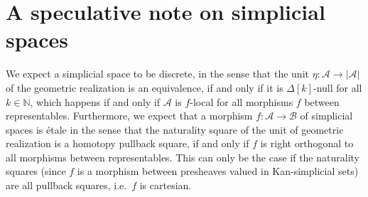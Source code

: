 \section{A speculative note on simplicial spaces}

We expect a simplicial space to be discrete, in the sense that the unit $\eta:\mathcal{A}\to |\mathcal{A}|$ of the geometric realization is an equivalence, if and only if it is $\Delta[k]$-null for all $k\in\mathbb{N}$, which happens if and only if $\mathcal{A}$ is $f$-local for all morphisms $f$ between representables. Furthermore, we expect that a morphism $f:\mathcal{A}\to\mathcal{B}$ of simplicial spaces is \'etale in the sense that the naturality square of the unit of geometric realization is a homotopy pullback square, if and only if $f$ is right orthogonal to all morphisms between representables. This can only be the case if the naturality squares (since $f$ is a morphism between presheaves valued in Kan-simplicial sets) are all pullback squares, i.e.~$f$ is cartesian. 
